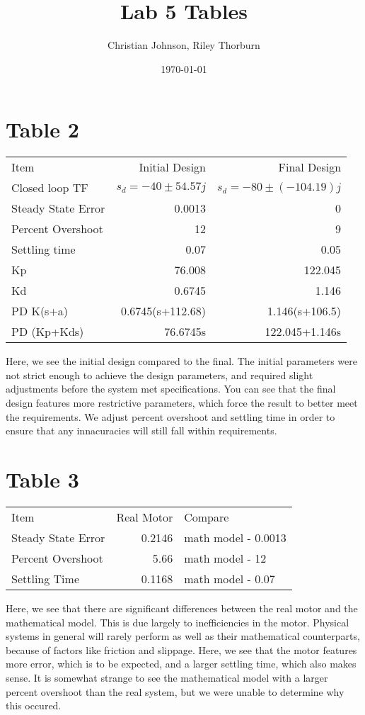 \documentclass[11pt]{article}
\author{Christian Johnson, Riley Thorburn}
\date{\today}
\title{Lab 5 Tables}
\begin{document}
\maketitle

\section{Table 2}
\label{sec:org2b591af}
\begin{center}
\begin{tabular}{lrr}
Item & Initial Design & Final Design\\[0pt]
Closed loop TF & \(s_d=-40\pm54.57j\) & \(s_d=-80\pm(-104.19)j\)\\[0pt]
Steady State Error & 0.0013 & 0\\[0pt]
Percent Overshoot & 12 & 9\\[0pt]
Settling time & 0.07 & 0.05\\[0pt]
Kp & 76.008 & 122.045\\[0pt]
Kd & 0.6745 & 1.146\\[0pt]
PD K(s+a) & 0.6745(s+112.68) & 1.146(s+106.5)\\[0pt]
PD (Kp+Kds) & 76.6745s & 122.045+1.146s\\[0pt]
\end{tabular}
\end{center}

Here, we see the initial design compared to the final. The initial parameters were not strict enough to achieve the design parameters, and required slight adjustments before the system met specifications.
You can see that the final design features more restrictive parameters, which force the result to better meet the requirements. We adjust percent overshoot and settling time in order to ensure that any innacuracies will still fall within requirements.

\section{Table 3}
\label{sec:org509c1ee}
\begin{center}
\begin{tabular}{lrl}
Item & Real Motor & Compare\\[0pt]
Steady State Error & 0.2146 & math model - 0.0013\\[0pt]
Percent Overshoot & 5.66 & math model - 12\\[0pt]
Settling Time & 0.1168 & math model - 0.07\\[0pt]
\end{tabular}
\end{center}

Here, we see that there are significant differences between the real motor and the mathematical model. This is due largely to inefficiencies in the motor. Physical systems in general will rarely perform as well as their mathematical counterparts, because of factors like friction and slippage. Here, we see that the motor features more error, which is to be expected, and a larger settling time, which also makes sense. It is somewhat strange to see the mathematical model with a larger percent overshoot than the real system, but we were unable to determine why this occured. 
\end{document}
